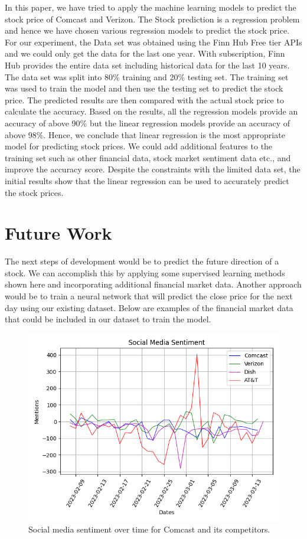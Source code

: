 \documentclass[conference]{IEEEtran}
\begin{document}
In this paper, we have tried to apply the machine learning models to predict the stock price of Comcast and Verizon.
The Stock prediction is a regression problem and hence we have chosen various regression models to predict the stock price.
For our experiment, the Data set was obtained using the Finn Hub Free tier APIs and we could only get the data for the last one year.
With subscription, Finn Hub provides the entire data set including historical data for the last 10 years. The data set was split into 80\% training and 20\% testing set.
The training set was used to train the model and then use the testing set to predict the stock price. The predicted results are then compared with the actual stock price to calculate the accuracy. Based on the results, all the regression models provide an accuracy of above 90\% but the linear regression models provide an accuracy of above 98\%.
Hence, we conclude that linear regression is the most appropriate model for predicting stock prices.
We could add additional features to the training set such as other financial data, stock market sentiment data etc., and improve the accuracy score. Despite the constraints with the limited data set, the initial results show that the linear regression can be used to accurately predict the stock prices.

\section{Future Work}
The next steps of development would be to predict the future direction of a stock.
We can accomplish this by applying some supervised learning methods shown here and incorporating additional financial market data.
Another approach would be to train a neural network that will predict the close price for the next day using our existing dataset. \cite{b1}
Below are examples of the financial market data that could be included in our dataset to train the model.


\begin{figure}
    \includegraphics[width=\columnwidth]{social_media_sentiment}
    \caption{Social media sentiment over time for Comcast and its competitors.}
\end{figure}
\end{document}
